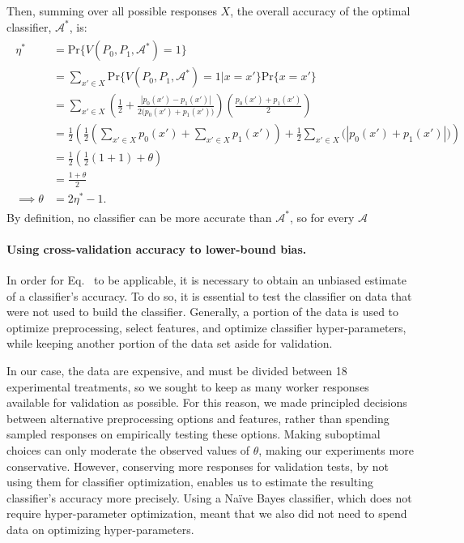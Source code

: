 \documentclass{sigchi}
\begin{document}
Then, summing over all possible responses $X$, 
the overall accuracy of the optimal classifier, $\mathcal{A^*}$, is:
\begin{align}
	\begin{split}
	\eta^* &= \mathrm{Pr}\{V(P_0, P_1, \mathcal{A}^*)=1\} \\
	&=\sum_{x'\in X} \mathrm{Pr}\{V(P_0,P_1,\mathcal{A}^*) = 1 | x = x' \} \mathrm{Pr}\{x = x'\}\\
		&= \sum_{x'\in X} \left(
				\frac{1}{2} + 
				\frac{|p_0(x') - p_1(x')|}{2 \big(p_0(x') + p_1(x') \big)}
			\right)
			\left(
				\frac{p_0(x') + p_1(x')}{2}
			\right)\\
		&= \frac{1}{2}\left(
				\frac{1}{2}(
					\sum_{x' \in X}p_0(x') + \sum_{x' \in X}p_1(x')
				) + 
				\frac{1}{2} \sum_{x' \in X} \big(|p_0(x') + p_1(x')|\big)
			\right) \\
		&= \frac{1}{2} \left( \frac{1}{2}(1 + 1) + \theta \right)\\
		&= \frac{1 + \theta}{2}\\
		\implies \theta &= 2\eta^* - 1.
	\end{split}
\end{align}
By definition, no classifier can be more accurate than $\mathcal{A^*}$, so
for every $\mathcal{A}$

\paragraph{Using cross-validation accuracy to lower-bound bias.}
	In order for Eq.~ to be applicable, it is necessary to 
	obtain an unbiased estimate of a classifier's accuracy.  To do so, it is
	essential to test the classifier on data that were not used to build 
	the classifier.  Generally, a portion of the data is used to
	optimize preprocessing, select features, and optimize 
	classifier hyper-parameters, while keeping another portion of the data
	set aside for validation.

	In our case, the data are expensive, and must be divided between 18
	experimental treatments, so we sought to keep as many worker responses
	available 
	for validation
	as possible.  For this reason, we made principled decisions 
	between alternative preprocessing options and features, 
	rather than spending sampled responses on empirically testing these 
	options.  Making
	suboptimal choices can only moderate the observed values 
	of $\theta$, making our experiments more conservative. 
	However, conserving more responses for validation 
	tests, by not using them for classifier optimization, 
	enables us to estimate the resulting classifier's accuracy more precisely.
	Using a Na\"ive Bayes classifier, which does not require hyper-parameter 
	optimization, meant that we also did not need to spend data on 
	optimizing hyper-parameters.  
	
\end{document}
